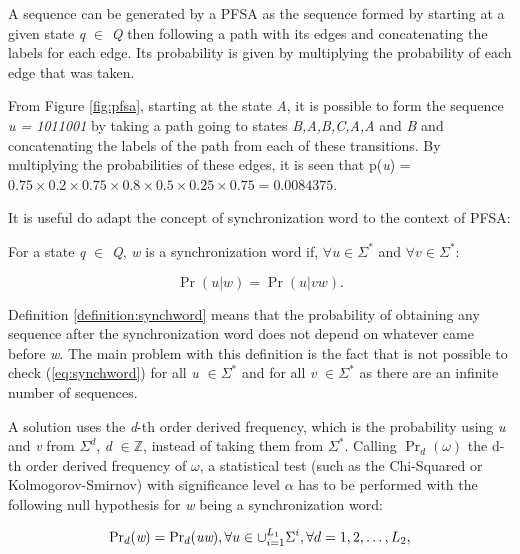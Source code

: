 {A sequence can be generated by a PFSA as the sequence formed by starting at a given state \textit{q} $\in$ \textit{Q} then following a path with its edges and concatenating the labels for each edge. Its probability is given by multiplying the probability of each edge that was taken.

From Figure \ref{fig:pfsa}, starting at the state \textit{A}, it is possible to form the sequence \textit{u = 1011001} by taking a path going to states \textit{B,A,B,C,A,A} and \textit{B} and concatenating the labels of the path from each of these transitions. By multiplying the probabilities of these edges, it is seen that p(\textit{u}) = $0.75\times0.2\times0.75\times0.8\times0.5\times0.25\times0.75 = 0.0084375$.

It is useful do adapt the concept of synchronization word to the context of PFSA:

\begin{definition}\label{definition:synchword}
For a state \textit{q} $\in$ \textit{Q}, \textit{w} is a synchronization word if, $\forall \textit{u} \in \Sigma^*$ and $\forall \textit{v} \in \Sigma^*$:

\begin{equation}
\Pr(\textit{u}|\textit{w}) = \Pr(\textit{u}|\textit{vw}).
\label{eq:synchword}
\end{equation}
\end{definition}

Definition \ref{definition:synchword} means that the probability of obtaining any sequence after the synchronization word does not depend on whatever came before \textit{w}. The main problem with this definition is the fact that is not possible to check (\ref{eq:synchword}) for all \textit{u} $\in \Sigma^*$ and for all \textit{v} $\in \Sigma^*$ as there are an infinite number of sequences.

  A solution uses the \textit{d}-th order derived frequency, which is the probability using \textit{u} and \textit{v} from $\Sigma^d$, \textit{d} $\in \mathbb{Z}$, instead of taking them from $\Sigma^*$. Calling $\Pr_d(\omega)$ the d-th order derived frequency of $\omega$, a statistical test (such as the Chi-Squared or Kolmogorov-Smirnov) with significance level $\alpha$ has to be performed with the following null hypothesis for \textit{w} being a synchronization word:

\begin{equation}
\textnormal{Pr}_{d}(\textit{w}) = \textnormal{Pr}_{d}(\textit{uw}), \forall u \in \cup_{i=1}^{L_1}\Sigma^i, \forall d = 1,2,\ldots,L_2,  
\label{eq:practsynchword}
\end{equation}

}
